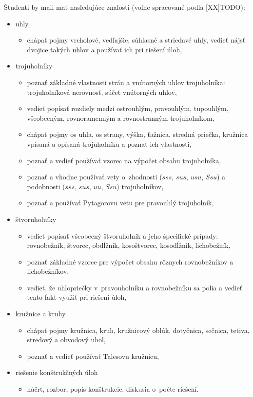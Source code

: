 Študenti by mali mať nasledujúce znalosti (voľne spracované podľa [XX]TODO):
\begin{itemize}
\item uhly
\begin{itemize}
\item chápať pojmy vrcholové, vedľajšie, súhlasné a striedavé uhly, vedieť nájsť dvojice takých uhlov a používať ich pri riešení úloh,
\end{itemize}
\item trojuholníky
\begin{itemize}
\item poznať základné vlastnosti strán a vnútorných uhlov trojuholníka: trojuholníková nerovnosť, súčet vnútorných uhlov,
\item vedieť popísať rozdiely medzi ostrouhlým, pravouhlým, tupouhlým, všeobecným, rovnoramenným a rovnostranným trojuholníkom,
\item chápať pojmy os uhla, os strany, výška, ťažnica, stredná priečka, kružnica vpísaná a opísaná trojuholníku a poznať ich vlastnosti,
\item poznať a vedieť používať vzorec na výpočet obsahu trojuholníka,
\item poznať a vhodne používať vety o~zhodnosti ($sss$, $sus$, $usu$, $Ssu$) a podobnosti ($sss$, $sus$, $uu$, $Ssu$) trojuholníkov,
\item poznať a používať Pytagorovu vetu pre pravouhlý trojuholník,
\end{itemize}
\item štvoruholníky
\begin{itemize}
\item vedieť popísať všeobecný štvoruholník a jeho špecifické prípady: rovnobežník, štvorec, obdĺžnik, kosoštvorec, kosodĺžnik, lichobežník,
\item poznať základné vzorce pre výpočet obsahu rôznych rovnobežníkov a lichobežníkov,
\item vedieť, že uhlopriečky v~pravouholníku a rovnobežníku sa polia a vedieť tento fakt využiť pri riešení úloh,
\end{itemize}
\item kružnice a kruhy
\begin{itemize}
\item chápať pojmy kružnica, kruh, kružnicový oblúk, dotyčnica, sečnica, tetiva, stredový a obvodový uhol,
\item poznať a vedieť používať Talesovu kružnicu,
\end{itemize}
\item riešenie konštrukčných úloh
\begin{itemize}
\item náčrt, rozbor, popis konštrukcie, diskusia o~počte riešení.
\end{itemize}
\end{itemize}
